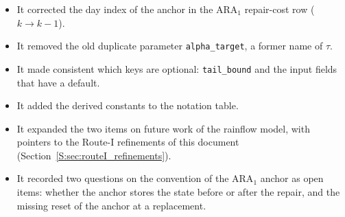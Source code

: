 \documentclass[11pt,a4paper]{article}
\theoremstyle{plain}
\theoremstyle{definition}
\theoremstyle{remark}
\begin{document}
\begin{itemize}
\begin{itemize}
      \item It corrected the day index of the anchor in the $\text{ARA}_1$ repair-cost row ($k \to k{-}1$).
      \item It removed the old duplicate parameter \texttt{alpha\_target}, a former name of $\tau$.
      \item It made consistent which keys are optional: \texttt{tail\_bound} and the input fields that have a default.
      \item It added the derived constants to the notation table.
      \item It expanded the two items on future work of the rainflow model, with pointers to the Route-I refinements of this document (Section~\ref{S:sec:routeI_refinements}).
      \item It recorded two questions on the convention of the $\text{ARA}_1$ anchor as open items: whether the anchor stores the state before or after the repair, and the missing reset of the anchor at a replacement.
    \end{itemize}
\end{itemize}
\end{document}
